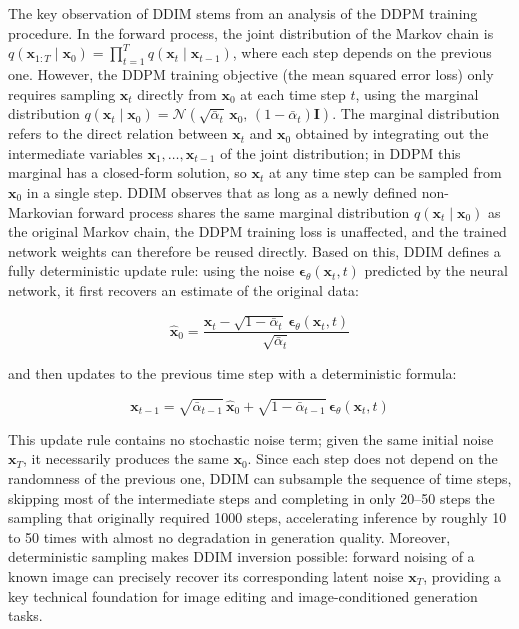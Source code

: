 The key observation of DDIM stems from an analysis of the DDPM training procedure.
In the forward process, the joint distribution of the Markov chain is
$q(\mathbf{x}_{1:T} \mid \mathbf{x}_0) = \prod_{t=1}^T q(\mathbf{x}_t \mid \mathbf{x}_{t-1})$,
where each step depends on the previous one.
However, the DDPM training objective (the mean squared error loss) only requires sampling $\mathbf{x}_t$
directly from $\mathbf{x}_0$ at each time step $t$,
using the marginal distribution
$q(\mathbf{x}_t \mid \mathbf{x}_0) = \mathcal{N}(\sqrt{\bar{\alpha}_t}\,\mathbf{x}_0,\,(1-\bar{\alpha}_t)\mathbf{I})$.
The marginal distribution refers to the direct relation between $\mathbf{x}_t$ and $\mathbf{x}_0$
obtained by integrating out the intermediate variables
$\mathbf{x}_1, \ldots, \mathbf{x}_{t-1}$ of the joint distribution;
in DDPM this marginal has a closed-form solution, so $\mathbf{x}_t$ at any time step can be sampled from $\mathbf{x}_0$ in a single step.
DDIM observes that as long as a newly defined non-Markovian forward process shares the same marginal distribution
$q(\mathbf{x}_t \mid \mathbf{x}_0)$ as the original Markov chain,
the DDPM training loss is unaffected, and the trained network weights can therefore be reused directly.
Based on this, DDIM defines a fully deterministic update rule:
using the noise $\boldsymbol{\epsilon}_\theta(\mathbf{x}_t, t)$ predicted by the neural network,
it first recovers an estimate of the original data:

\begin{equation}
  \hat{\mathbf{x}}_0 =
    \frac{\mathbf{x}_t - \sqrt{1-\bar{\alpha}_t}\,\boldsymbol{\epsilon}_\theta(\mathbf{x}_t, t)}%
         {\sqrt{\bar{\alpha}_t}}
\end{equation}

and then updates to the previous time step with a deterministic formula:

\begin{equation}
  \mathbf{x}_{t-1} =
    \sqrt{\bar{\alpha}_{t-1}}\,\hat{\mathbf{x}}_0
    + \sqrt{1 - \bar{\alpha}_{t-1}}\,\boldsymbol{\epsilon}_\theta(\mathbf{x}_t, t)
\end{equation}

This update rule contains no stochastic noise term;
given the same initial noise $\mathbf{x}_T$, it necessarily produces the same $\mathbf{x}_0$.
Since each step does not depend on the randomness of the previous one,
DDIM can subsample the sequence of time steps,
skipping most of the intermediate steps
and completing in only 20--50 steps the sampling that originally required 1000 steps,
accelerating inference by roughly 10 to 50 times with almost no degradation in generation quality.
Moreover, deterministic sampling makes DDIM inversion possible:
forward noising of a known image can precisely recover its corresponding latent noise $\mathbf{x}_T$,
providing a key technical foundation for image editing and image-conditioned generation tasks.

